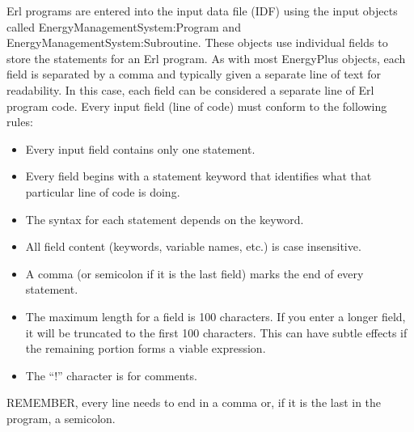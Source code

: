 Erl programs are entered into the input data file (IDF) using the input objects called EnergyManagementSystem:Program and EnergyManagementSystem:Subroutine. These objects use individual fields to store the statements for an Erl program. As with most EnergyPlus objects, each field is separated by a comma and typically given a separate line of text for readability. In this case, each field can be considered a separate line of Erl program code. Every input field (line of code) must conform to the following rules:

\begin{itemize}
\item
  Every input field contains only one statement.
\item
  Every field begins with a statement keyword that identifies what that particular line of code is doing.
\item
  The syntax for each statement depends on the keyword.
\item
  All field content (keywords, variable names, etc.) is case insensitive.
\item
  A comma (or semicolon if it is the last field) marks the end of every statement.
\item
  The maximum length for a field is 100 characters. If you enter a longer field, it will be truncated to the first 100 characters. This can have subtle effects if the remaining portion forms a viable expression.
\item
  The ``!'' character is for comments.
\end{itemize}

REMEMBER, every line needs to end in a comma or, if it is the last in the program, a semicolon.
